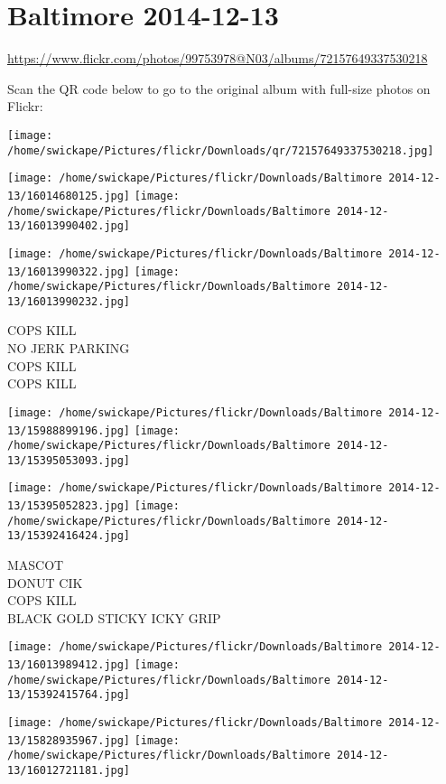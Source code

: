 \documentclass[10pt,letterpaper]{article}
\title{}
\author{}
\date{}
\begin{document}
\section*{Baltimore 2014-12-13}

\url{https://www.flickr.com/photos/99753978@N03/albums/72157649337530218}

Scan the QR code below to go to the original album with full-size photos on Flickr:

\texttt{[image: /home/swickape/Pictures/flickr/Downloads/qr/72157649337530218.jpg]}
\pagebreak

\texttt{[image: /home/swickape/Pictures/flickr/Downloads/Baltimore 2014-12-13/16014680125.jpg]}
\texttt{[image: /home/swickape/Pictures/flickr/Downloads/Baltimore 2014-12-13/16013990402.jpg]}

\texttt{[image: /home/swickape/Pictures/flickr/Downloads/Baltimore 2014-12-13/16013990322.jpg]}
\texttt{[image: /home/swickape/Pictures/flickr/Downloads/Baltimore 2014-12-13/16013990232.jpg]}

COPS KILL\\
NO JERK PARKING\\
COPS KILL\\
COPS KILL
\pagebreak

\texttt{[image: /home/swickape/Pictures/flickr/Downloads/Baltimore 2014-12-13/15988899196.jpg]}
\texttt{[image: /home/swickape/Pictures/flickr/Downloads/Baltimore 2014-12-13/15395053093.jpg]}

\texttt{[image: /home/swickape/Pictures/flickr/Downloads/Baltimore 2014-12-13/15395052823.jpg]}
\texttt{[image: /home/swickape/Pictures/flickr/Downloads/Baltimore 2014-12-13/15392416424.jpg]}

MASCOT\\
DONUT CIK\\
COPS KILL\\
BLACK GOLD STICKY ICKY GRIP
\pagebreak

\texttt{[image: /home/swickape/Pictures/flickr/Downloads/Baltimore 2014-12-13/16013989412.jpg]}
\texttt{[image: /home/swickape/Pictures/flickr/Downloads/Baltimore 2014-12-13/15392415764.jpg]}

\texttt{[image: /home/swickape/Pictures/flickr/Downloads/Baltimore 2014-12-13/15828935967.jpg]}
\texttt{[image: /home/swickape/Pictures/flickr/Downloads/Baltimore 2014-12-13/16012721181.jpg]}
\end{document}

